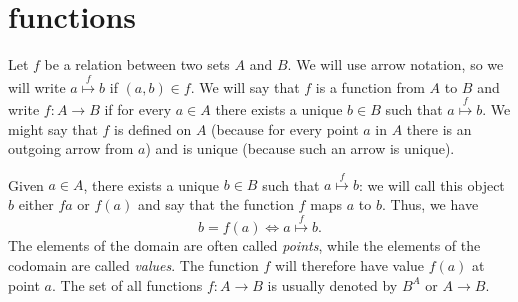 \section{functions}

Let $f$ be a relation between two sets $A$ and $B$. We will use arrow notation,
so we will write $a\stackrel f\mapsto b$ if $(a,b)\in f$. We will say that $f$
is a function from $A$ to $B$ and write $f\colon A\to B$ if for every $a\in A$
there exists a unique $b\in B$ such that $a \stackrel f \mapsto b$. We might say
that $f$ is defined on $A$ (because for every point $a$ in $A$ there is an
outgoing arrow from $a$) and is unique (because such an arrow is unique).

Given $a\in A$, there exists a unique $b\in B$ such that $a\stackrel f \mapsto
b$: we will call this object $b$ either $fa$ or $f(a)$  and say
that the function $f$ maps $a$ to $b$. Thus, we have
\[
 b=f(a) \iff a\stackrel f \mapsto b.
\]
The elements of the domain are often called \emph{points}, while the elements of
the codomain are called \emph{values}. The function $f$ will therefore have
value $f(a)$ at point $a$. The set of all functions $f\colon A\to B$ is usually
denoted by $B^A$ or $A\to B$.   

